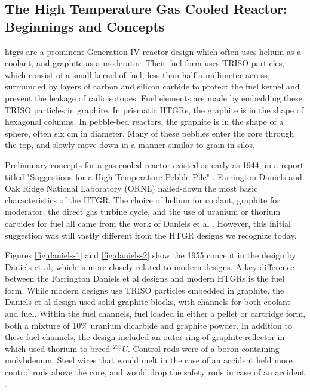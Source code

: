 \subsection{The High Temperature Gas Cooled Reactor: Beginnings and Concepts}

\acrshort{htgr}s are a prominent Generation IV reactor design which often uses helium as a coolant, and graphite as a moderator.  Their fuel form uses TRISO particles, which consist of a small kernel of fuel, less than half a millimeter across, surrounded by layers of carbon and silicon carbide to protect the fuel kernel and prevent the leakage of radioisotopes.  Fuel elements are made by embedding these TRISO particles in graphite.  In prismatic HTGRs, the graphite is in the shape of hexagonal columns.  In pebble-bed reactors, the graphite is in the shape of a sphere, often six cm in diameter.  Many of these pebbles enter the core through the top, and slowly move down in a manner similar to grain in silos.

Preliminary concepts for a gas-cooled reactor existed as early as 1944, in a report titled "Suggestions for a High-Temperature Pebble Pile" \cite{daniels_suggestions_1944}.  Farrington Daniels and Oak Ridge National Laboratory (ORNL) nailed-down the most basic characteristics of the HTGR.  The choice of helium for coolant, graphite for moderator, the direct gas turbine cycle, and the use of uranium or thorium carbides for fuel all came from the work of Daniels et al \cite{simnad_early_1991}.  However, this initial suggestion was still vastly different from the HTGR designs we recognize today.




Figures \ref{fig:daniels-1} and \ref{fig:daniels-2} show the 1955 concept in the design by Daniels et al, which is more closely related to modern designs.  A key difference between the Farrington Daniels et al designs and modern HTGRs is the fuel form.  While modern designs use TRISO particles embedded in graphite, the Daniels et al design used solid graphite blocks, with channels for both coolant and fuel.  Within the fuel channels, fuel loaded in either a pellet or cartridge form, both a mixture of 10$\%$ uranium dicarbide and graphite powder.  In addition to these fuel channels, the design included an outer ring of graphite reflector in which used thorium to breed $^{233}U$.  Control rods were of a boron-containing molybdenum.  Steel wires that would melt in the case of an accident held more control rods above the core, and would drop the safety rods in case of an accident \cite{simnad_early_1991}.

